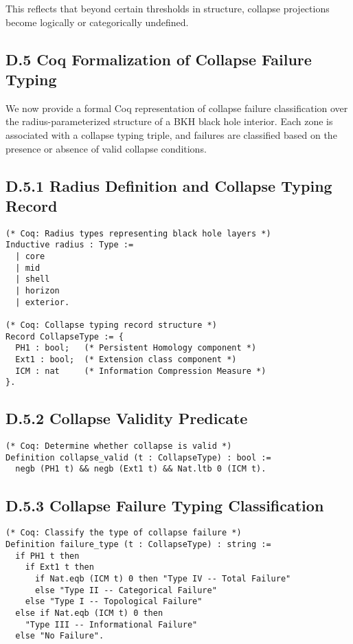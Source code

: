 \documentclass[11pt]{article}
\begin{document}
This reflects that beyond certain thresholds in structure, collapse projections become logically or categorically undefined.

\subsection*{D.5 Coq Formalization of Collapse Failure Typing}

We now provide a formal Coq representation of collapse failure classification over the radius-parameterized structure of a BKH black hole interior. Each zone is associated with a collapse typing triple, and failures are classified based on the presence or absence of valid collapse conditions.

\subsection*{D.5.1 Radius Definition and Collapse Typing Record}

\begin{lstlisting}
(* Coq: Radius types representing black hole layers *)
Inductive radius : Type :=
  | core
  | mid
  | shell
  | horizon
  | exterior.

(* Coq: Collapse typing record structure *)
Record CollapseType := {
  PH1 : bool;   (* Persistent Homology component *)
  Ext1 : bool;  (* Extension class component *)
  ICM : nat     (* Information Compression Measure *)
}.
\end{lstlisting}

\subsection*{D.5.2 Collapse Validity Predicate}

\begin{lstlisting}
(* Coq: Determine whether collapse is valid *)
Definition collapse_valid (t : CollapseType) : bool :=
  negb (PH1 t) && negb (Ext1 t) && Nat.ltb 0 (ICM t).
\end{lstlisting}

\subsection*{D.5.3 Collapse Failure Typing Classification}

\begin{lstlisting}[language=Coq]
(* Coq: Classify the type of collapse failure *)
Definition failure_type (t : CollapseType) : string :=
  if PH1 t then
    if Ext1 t then
      if Nat.eqb (ICM t) 0 then "Type IV -- Total Failure"
      else "Type II -- Categorical Failure"
    else "Type I -- Topological Failure"
  else if Nat.eqb (ICM t) 0 then
    "Type III -- Informational Failure"
  else "No Failure".
\end{lstlisting}
\end{document}
